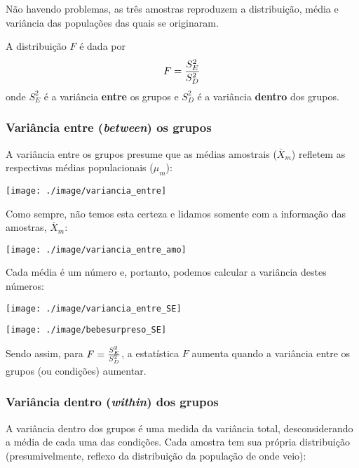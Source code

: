 \documentclass[]{article}
\begin{document}
Não havendo problemas, as três amostras reproduzem a distribuição, média
e variância das populações das quais se originaram.

A distribuição \(F\) é dada por \[F = {{S_E^2}\over{S_D^2}}\] onde
\(S_E^2\) é a variância \textbf{entre} os grupos e \(S_D^2\) é a
variância \textbf{dentro} dos grupos.

\subsubsection{\texorpdfstring{Variância entre (\emph{between}) os
grupos}{Variância entre (between) os grupos}}\label{variancia-entre-between-os-grupos}

A variância entre os grupos presume que as médias amostrais
(\(\bar{X}_m\)) refletem as respectivas médias populacionais
(\(\mu_m\)):

\begin{center}\texttt{[image: ./image/variancia\_entre]} \end{center}

Como sempre, não temos esta certeza e lidamos somente com a informação
das amostras, \(\bar{X}_m\):

\begin{center}\texttt{[image: ./image/variancia\_entre\_amo]} \end{center}

Cada média é um número e, portanto, podemos calcular a variância destes
números:

\begin{center}\texttt{[image: ./image/variancia\_entre\_SE]} \end{center}

\begin{center}\texttt{[image: ./image/bebesurpreso\_SE]} \end{center}

Sendo assim, para \(F = {{S_E^2}\over{S_D^2}}\), a estatística \(F\)
aumenta quando a variância entre os grupos (ou condições) aumentar.

\subsubsection{\texorpdfstring{Variância dentro (\emph{within}) dos
grupos}{Variância dentro (within) dos grupos}}\label{variancia-dentro-within-dos-grupos}

A variância dentro dos grupos é uma medida da variância total,
desconsiderando a média de cada uma das condições. Cada amostra tem sua
própria distribuição (presumivelmente, reflexo da distribuição da
população de onde veio):
\end{document}
